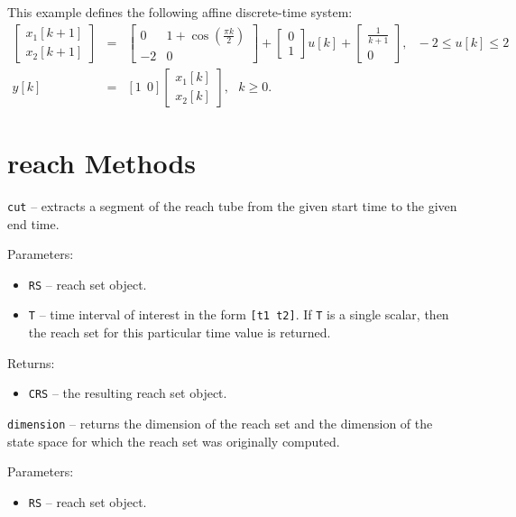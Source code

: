 This example defines the following affine discrete-time system:
\begin{eqnarray*}
\left[\begin{array}{c}
x_1[k+1]\\
x_2[k+1]\end{array}\right] & = & \left[\begin{array}{cc}
0 & 1 + \cos(\frac{\pi k}{2})\\
-2 & 0\end{array}\right] + \left[\begin{array}{c}
0\\
1\end{array}\right]u[k] + \left[\begin{array}{c}
\frac{1}{k+1}\\
0\end{array}\right], ~~~ -2\leq u[k]\leq2\\
y[k] & = & [1 ~~ 0]\left[\begin{array}{c}
x_1[k]\\
x_2[k]\end{array}\right], ~~~ k\geq0.
\end{eqnarray*}

\newpage

\section{reach Methods}
{\Large {\tt cut}} -- extracts a segment of the reach tube from the given start
time to the given end time.

Parameters:
\begin{itemize}
\item {\tt RS} -- reach set object.
\item {\tt T} -- time interval of interest in the form {\tt [t1 t2]}.
If {\tt T} is a single scalar, then the reach set for this particular time
value is returned.
\end{itemize}

Returns:
\begin{itemize}
\item {\tt CRS} -- the resulting reach set object.
\end{itemize}

\newpage

{\Large {\tt dimension}} -- returns the dimension of the reach set and
the dimension of the state space for which the reach set was originally
computed.

Parameters:
\begin{itemize}
\item {\tt RS} -- reach set object.
\end{itemize}

